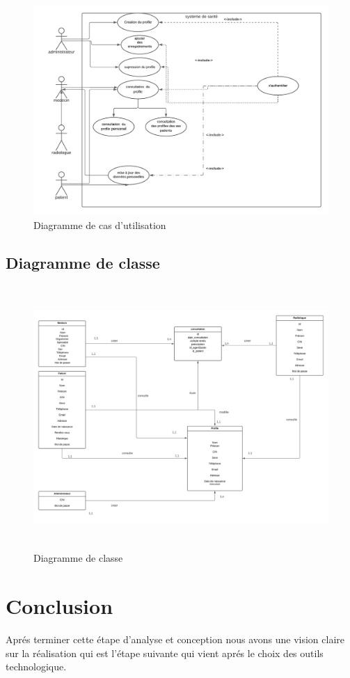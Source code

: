 \begin{figure}[!h]
\begin{center}
\includegraphics[height=8cm,width=18cm]{usecasediag.png}
\end{center}
\caption{Diagramme de cas d'utilisation}
\end{figure}

\subsection{Diagramme de classe}

\begin{figure}[!h]
\begin{center}
\includegraphics[height=10cm,width=18cm]{classdiag.png}
\end{center}
\caption{Diagramme de classe}
\end{figure}


\section{Conclusion} 

Aprés terminer cette étape d'analyse et conception nous avons une vision claire sur la réalisation qui est l'étape suivante qui vient aprés le choix des outils technologique.



